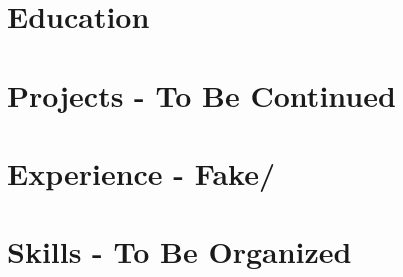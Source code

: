 \documentclass[letter,10pt]{article}
\begin{document}


\section{Education}


\section{Projects - \textbf{To Be Continued}}


\section{Experience - \textbf{Fake/}}



\section{Skills - \textbf{To Be Organized}}

\end{document}

